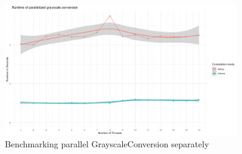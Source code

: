 \documentclass[sigconf]{acmart}
\begin{document}
\begin{figure}[h]
  \centering
  \includegraphics[width=0.9\textwidth]{./graphics/parallelgrayscale_benchmark.png}
  \caption{Benchmarking parallel GrayscaleConversion separately} 
\end{figure}
\end{document}
